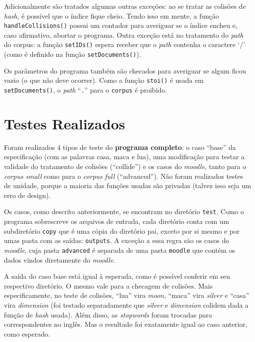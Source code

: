 \documentclass{article}
\def\code#1{\texttt{#1}}
\begin{document}
Adicionalmente são tratados algumas outras exceções: ao se tratar as colisões de \textit{hash}, é possível que o índice fique cheio. Tendo isso em mente, a função \code{handleCollisions()} possui um contador para averiguar se o índice encheu e, caso afirmativo, abortar o programa. Outra exceção está no tratamento do \textit{path} do corpus: a função \code{setIDs()} espera receber que o \textit{path} contenha o caractere `/' (como é definido na função \code{setDocuments()}).

Os parâmetros do programa também são checados para averiguar se algum ficou vazio (o que não deve ocorrer). Como a função \code{stoi()} é usada em \code{setDocuments()}, o \textit{path} ``\code{.}'' para o \code{corpus} é proibido.

\section{Testes Realizados}

Foram realizados 4 tipos de teste do \textbf{programa completo}: o caso ``base'' da especificação (com as palavras casa, maca e lua), uma modificação para testar a validade do tratamento de colisões (``collide'') e os casos do \textit{moodle}, tanto para o \textit{corpus small} como para o \textit{corpus full} (``advanced''). Não foram realizados testes de unidade, porque a maioria das funções usadas são privadas (talvez isso seja um erro de design).

Os casos, como descrito anteriormente, se encontram no diretório \code{test}. Como o programa sobrescreve os arquivos de entrada, cada diretório conta com um subdiretório \code{copy} que é uma cópia do diretório pai, exceto por si mesmo e por umas pasta com as saídas: \code{outputs}. A exceção a essa regra são os casos do \textit{moodle}, cuja pasta \code{advanced} é separada de uma pasta \code{moodle} que contém os dados vindos diretamente do \textit{moodle}.

A saída do caso base está igual à esperada, como é possível conferir em seu respectivo diretório. O mesmo vale para a checagem de colisões. Mais especificamente, no teste de colisões, ``lua'' vira \textit{moon}, ``maca'' vira \textit{silver} e ``casa'' vira \textit{dimension} (foi testado separadamente que \textit{silver} e \textit{dimension} colidem dada a função de \textit{hash} usada). Além disso, as \textit{stopwords} foram trocadas para correspondentes no inglês. Mas o resultado foi exatamente igual ao caso anterior, como esperado.
\end{document}
